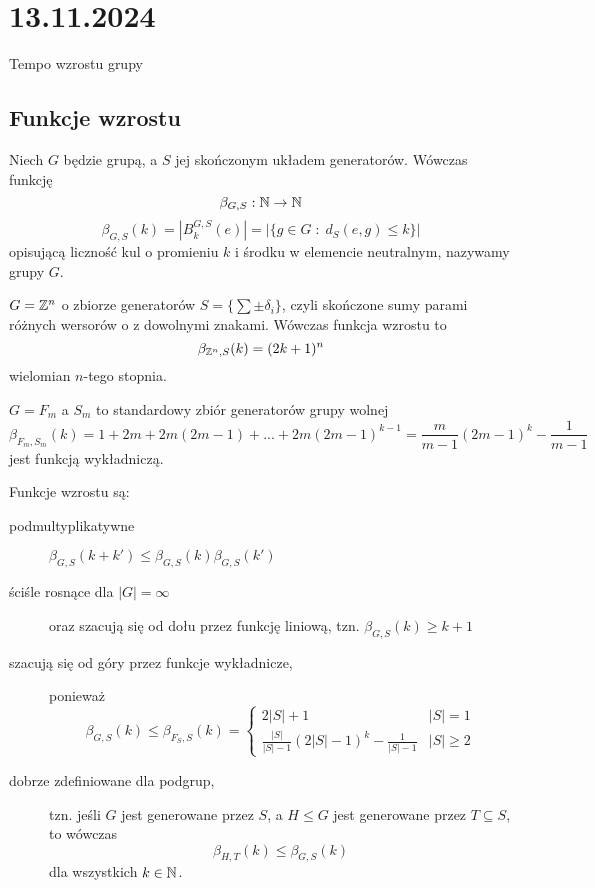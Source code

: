 \section{13.11.2024}{Tempo wzrostu grupy}

\subsection{Funkcje wzrostu}


\begin{definition}{}{}
  Niech $G$ będzie grupą, a $S$ jej skończonym układem generatorów. Wówczas funkcję 
  $$\beta_{G,S}:\mathbb{N}\to\mathbb{N}$$
  $$\beta_{G,S}(k)=|B_k^{G,S}(e)|=|\{g\in G\;:\;d_S(e, g)\leq k\}|$$
  opisującą liczność kul o promieniu $k$ i środku w elemencie neutralnym, nazywamy  grupy $G$.
\end{definition}

\begin{example}[m]
  \item $G=\mathbb{Z}^n$ o zbiorze generatorów $S=\{\sum\pm\delta_i\}$, czyli skończone sumy parami różnych wersorów o z dowolnymi znakami. Wówczas funkcja wzrostu to 
    $$\beta_{\mathbb{Z}^n, S}(k)=(2k+1)^n$$
    wielomian $n$-tego stopnia.
  \item $G=F_m$ a $S_m$ to standardowy zbiór generatorów grupy wolnej
    $$\beta_{F_m, S_m}(k)=1+2m+2m(2m-1)+...+2m(2m-1)^{k-1}=\frac{m}{m-1}(2m-1)^k-\frac{1}{m-1}$$
    jest funkcją wykładniczą.
\end{example}


Funkcje wzrostu są:
\begin{description}
  \item[podmultyplikatywne] $\beta_{G, S}(k+k')\leq \beta_{G,S}(k)\beta_{G, S}(k')$
  \item[ściśle rosnące dla $|G|=\infty$] oraz szacują się od dołu przez funkcję liniową, tzn. $\beta_{G,S}(k)\geq k+1$
  \item[szacują się od góry przez funkcje wykładnicze,] ponieważ
    $$\beta_{G,S}(k)\leq\beta_{F_S, S}(k)=\begin{cases}2|S|+1&|S|=1\\\frac{|S|}{|S|-1}(2|S|-1)^k-\frac{1}{|S|-1}&|S|\geq2\end{cases}$$
  \item[dobrze zdefiniowane dla podgrup,] tzn. jeśli $G$ jest generowane przez $S$, a $H\leq G$ jest generowane przez $T\subseteq S$, to wówczas 
    $$\beta_{H,T}(k)\leq\beta_{G,S}(k)$$
    dla wszystkich $k\in\mathbb{N}$.
\end{description}


